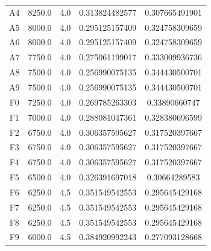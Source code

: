 \documentclass[11pt]{article}      %
\begin{document}
\begin{table}[hbtp]
\begin{center}
\begin{tabular}{| c | c | c | c | c |}
A4 & 8250.0 & 4.0 & 0.313824482577 & 0.307665491901 \\
A5 & 8000.0 & 4.0 & 0.295125157409 & 0.324758309659 \\
A6 & 8000.0 & 4.0 & 0.295125157409 & 0.324758309659 \\
A7 & 7750.0 & 4.0 & 0.275061199017 & 0.333009936736 \\
A8 & 7500.0 & 4.0 & 0.256990075135 & 0.344430500701 \\
A9 & 7500.0 & 4.0 & 0.256990075135 & 0.344430500701 \\
F0 & 7250.0 & 4.0 & 0.269785263303 & 0.33890660747 \\
F1 & 7000.0 & 4.0 & 0.288081047361 & 0.328380696599 \\
F2 & 6750.0 & 4.0 & 0.306357595627 & 0.317520397667 \\
F3 & 6750.0 & 4.0 & 0.306357595627 & 0.317520397667 \\
F4 & 6750.0 & 4.0 & 0.306357595627 & 0.317520397667 \\
F5 & 6500.0 & 4.0 & 0.326391697018 & 0.30664289583 \\
F6 & 6250.0 & 4.5 & 0.351549542553 & 0.295645429168 \\
F7 & 6250.0 & 4.5 & 0.351549542553 & 0.295645429168 \\
F8 & 6250.0 & 4.5 & 0.351549542553 & 0.295645429168 \\
F9 & 6000.0 & 4.5 & 0.384920992243 & 0.277093128668 \\
    \hline
  \end{tabular}
  \label{tab:limb1}
  \end{center}
\end{table}
\end{document}
